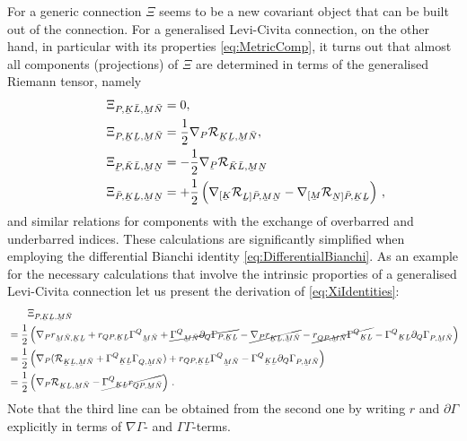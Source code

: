 \documentclass[11pt,a4paper]{article}
\numberwithin{equation}{section}
\newcommand{\ubar}[1]{\underaccent{\bar}{#1}}
\newcommand{\bK}{\bar{K}}
\newcommand{\bL}{\bar{L}}
\newcommand{\bN}{\bar{N}}
\newcommand{\bP}{\bar{P}}
\newcommand{\ubK}{\ubar{K}}
\newcommand{\ubL}{\ubar{L}}
\newcommand{\ubM}{\ubar{M}}
\newcommand{\ubN}{\ubar{N}}
\newcommand{\ubP}{\ubar{P}}
\begin{document}
For a generic connection $\Xi$ seems to be a new covariant object that can be built out of the connection. For a generalised Levi-Civita connection, on the other hand, in particular with its properties \eqref{eq:MetricComp}, it turns out that almost all components (projections) of $\Xi$ are determined in terms of the generalised Riemann tensor, namely
\begin{align}
    \Xi_{P,\ubK\bL,\ubM\bN} &= 0, \\
   \Xi_{P,\ubK\ubL,\ubM\bN} &= \frac{1}{2} \nabla_P \mathcal{R}_{\ubK\ubL,\ubM\bN}, \label{eq:XiIdentities}\\
   \qquad \Xi_{\ubP,\bK\bL,\ubM\ubN} &= - \frac{1}{2} \nabla_{\ubP} \mathcal{R}_{\bK\bL,\ubM\ubN} \\
    \Xi_{\bP,\ubK\ubL,\ubM\ubN} &= + \frac{1}{2} \left( \nabla_{[\ubK} \mathcal{R}_{\ubL]\bP,\ubM\ubN} - \nabla_{[\ubM} \mathcal{R}_{\ubN]\bP,\ubK\ubL} \right)\,, \label{eq:XiIdentities2}
\end{align}
and similar relations for components with the exchange of overbarred and underbarred indices. These calculations are significantly simplified when employing the differential Bianchi identity \eqref{eq:DifferentialBianchi}. As an example for the necessary calculations that involve the intrinsic proporties of a generalised Levi-Civita connection let us present the derivation of \eqref{eq:XiIdentities}:
\begin{align*}
   &{} \qquad \Xi_{P,\ubK\ubL,\ubM\bN} \\
     &= \frac{1}{2} \left( \nabla_P r_{\ubM\bN,\ubK\ubL} + r_{QP,\ubK\ubL} {\Gamma^Q}_{\ubM\bN} + \cancel{{\Gamma^Q}_{\ubM\bN} \partial_Q \Gamma_{P,\ubK\ubL}} - \cancel{\nabla_P r_{\ubK\ubL,\ubM\bN}} - \cancel{r_{QP,\ubM\bN} {\Gamma^Q}_{\ubK\ubL}} - {\Gamma^Q}_{\ubK\ubL} \partial_Q \Gamma_{P,\ubM\bN} \right) \\
    &= \frac{1}{2} \left( \nabla_P (\mathcal{R}_{\ubK\ubL,\ubM\bN} + {\Gamma^Q}_{\ubK\ubL} {\Gamma_{Q,\ubM\bN}})  + r_{QP,\ubK\ubL} {\Gamma^Q}_{\ubM\bN} - {\Gamma^Q}_{\ubK\ubL} \partial_Q \Gamma_{P,\ubM\bN} \right) \\
    &= \frac{1}{2} \left( \nabla_P \mathcal{R}_{\ubK\ubL,\ubM\bN} - \cancel{ {\Gamma^Q}_{\ubK \ubL} r_{QP,\ubM \bN}} \right)\,.
\end{align*}
Note that the third line can be obtained from the second one by writing $r$ and $\partial \Gamma$ explicitly in terms of $\nabla \Gamma$- and $\Gamma \Gamma$-terms.
\end{document}
